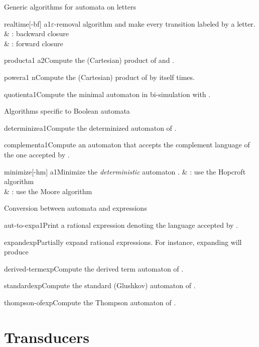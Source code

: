 \begin{fnsection}{Generic algorithms for automata on letters}
\item{realtime}{[-bf] a1}{$\varepsilon$-removal algorithm and make
    every transition labeled by a letter.}
  &  : backward closure\\
  &  : forward closure\\
\item{product}{a1 a2}{Compute the (Cartesian) product of  and
    .}
\item{power}{a1 n}{Compute the (Cartesian) product of  by
    itself  times.}
\item{quotient}{a1}{Compute the minimal automaton in bi-simulation
    with .}  \hline
\end{fnsection}

\begin{fnsection}{Algorithms specific to Boolean automata}
\item{determinize}{a1}{Compute the determinized automaton of
    .}
\item{complement}{a1}{Compute an automaton that accepts the complement
    language of the one accepted by .}
\item{minimize}{[-hm] a1}{Minimize the {\em deterministic} automaton
    .}
  &  : use the Hopcroft algorithm\\
  &  : use the Moore algorithm\\
  \hline
\end{fnsection}

\begin{fnsection}{Conversion between automata and expressions}
\item{aut-to-exp}{a1}{Print a rational expression denoting the
    language accepted by .}
\item{expand}{exp}{Partially expand rational expressions. For
    instance, expanding  will produce
    }
\item{derived-term}{exp}{Compute the derived term automaton of
    .}
\item{standard}{exp}{Compute the standard (Glushkov) automaton of
    .}
\item{thompson-of}{exp}{Compute the Thompson automaton of .}
  \hline
\end{fnsection}


\newpage
\section{Transducers}

